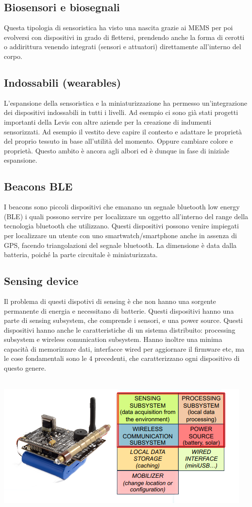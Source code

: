 \subsection{Biosensori e biosegnali}
Questa tipologia di sensoristica ha visto una nascita grazie ai MEMS per poi evolversi con dispositivi in grado di flettersi, prendendo anche la forma di cerotti o addirittura venendo integrati (sensori e attuatori) direttamente all'interno del corpo. 

\subsection{Indossabili (wearables)}
L'espansione della sensoristica e la miniaturizzazione ha permesso un'integrazione dei dispositivi indossabili in tutti i livelli. Ad esempio ci sono già stati progetti importanti della Levis con altre aziende per la creazione di indumenti sensorizzati. Ad esempio il vestito deve capire il contesto e adattare le proprietà del proprio tessuto in base all'utilità del momento. Oppure cambiare colore e proprietà. Questo ambito è ancora agli albori ed è dunque in fase di iniziale espansione.


\subsection{Beacons BLE}
I beacons sono piccoli dispositivi che emanano un segnale bluetooth low energy (BLE) i quali possono servire per localizzare un oggetto all'interno del range della tecnologia bluetooth che utilizzano. Questi dispositivi possono venire impiegati per localizzare un utente con uno smartwatch/smartphone anche in assenza di GPS, facendo triangolazioni del segnale bluetooth. La dimensione è data dalla batteria, poiché  la parte circuitale è miniaturizzata.


\subsection{Sensing device}
Il problema di questi dispotivi di sensing è che non hanno una sorgente permanente di energia e necessitano di batterie. Questi dispositivi hanno una parte di sensing subsystem, che comprende i sensori, e una power source. Questi dispositivi hanno anche le caratteristiche di un sistema distribuito: processing subsystem e wireless comunication subsystem. Hanno inoltre una minima capacità di memorizzare dati, interfacce wired per aggiornare il firmware etc, ma le cose fondamentali sono le 4 precedenti, che caratterizzano ogni dispositivo di questo genere.
\\
\\
\begin{center}
    \includegraphics[width = .6\textwidth]{images/lezione9/sensing_device.png}
\end{center}

